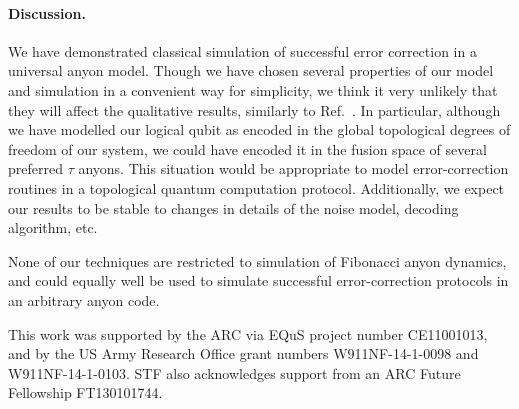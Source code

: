 \documentclass[aps, prl, letterpaper, twocolumn, superscriptaddress, notitlepage, 10pt]{revtex4-1}
\begin{document}
\paragraph{Discussion.}

	We have demonstrated classical simulation of successful error correction in a universal anyon model. Though we have chosen several properties of our model and simulation in a convenient way for simplicity, we think it very unlikely that they will affect the qualitative results, similarly to Ref.~\cite{Brell2013}. In particular, although we have modelled our logical qubit as encoded in the global topological degrees of freedom of our system, we could have encoded it in the fusion space of several preferred $\tau$ anyons. This situation would be appropriate to model error-correction routines in a topological quantum computation protocol. Additionally, we expect our results to be stable to changes in details of the noise model, decoding algorithm, etc.
	
	None of our techniques are restricted to simulation of Fibonacci anyon dynamics, and could equally well be used to simulate successful error-correction protocols in an arbitrary anyon code.	
	




\acknowledgements 

 This work was supported by the ARC via EQuS project number CE11001013, and by the US Army Research Office grant numbers W911NF-14-1-0098 and W911NF-14-1-0103. STF also acknowledges support from an ARC Future Fellowship FT130101744. 

%

\end{document}
